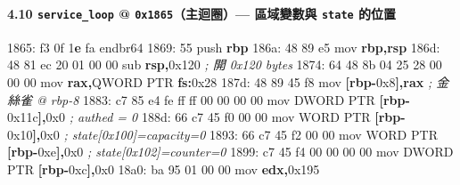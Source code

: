 \documentclass[10pt,a4paper]{article}
\newenvironment{Shaded}{\begin{snugshade}}{\end{snugshade}}
\newcommand{\BaseNTok}[1]{\textcolor[rgb]{0.00,0.00,0.81}{#1}}
\newcommand{\BuiltInTok}[1]{#1}
\newcommand{\CommentTok}[1]{\textcolor[rgb]{0.56,0.35,0.01}{\textit{#1}}}
\newcommand{\DataTypeTok}[1]{\textcolor[rgb]{0.13,0.29,0.53}{#1}}
\newcommand{\DecValTok}[1]{\textcolor[rgb]{0.00,0.00,0.81}{#1}}
\newcommand{\ErrorTok}[1]{\textcolor[rgb]{0.64,0.00,0.00}{\textbf{#1}}}
\newcommand{\FloatTok}[1]{\textcolor[rgb]{0.00,0.00,0.81}{#1}}
\newcommand{\KeywordTok}[1]{\textcolor[rgb]{0.13,0.29,0.53}{\textbf{#1}}}
\newcommand{\NormalTok}[1]{#1}
\newcommand{\OperatorTok}[1]{\textcolor[rgb]{0.81,0.36,0.00}{\textbf{#1}}}
\renewenvironment{Shaded}{%
  \def\FrameCommand{\fboxsep=3.2pt\colorbox{shadecolor}}%
  \MakeFramed{\advance\hsize-\width\FrameRestore\small}%
}{%
  \endMakeFramed
}
\begin{document}
\paragraph{\texorpdfstring{4.10 \texttt{service\_\allowbreak{}loop} @
\texttt{0x1865}（主迴圈）--- 區域變數與 \texttt{state}
的位置}{4.10 service\_loop @ 0x1865（主迴圈）--- 區域變數與 state 的位置}}\label{service_loop-0x1865ux4e3bux8ff4ux5708-ux5340ux57dfux8b8aux6578ux8207-state-ux7684ux4f4dux7f6e}

\begin{Shaded}
\begin{Highlighting}[]
\NormalTok{1865: f3 }\FloatTok{0}\BaseNTok{f} \DecValTok{1}\ErrorTok{e}\NormalTok{ fa            endbr64}
\NormalTok{1869: 55                     }\BuiltInTok{push}   \KeywordTok{rbp}
\NormalTok{186a: 48 89 e5               mov    }\KeywordTok{rbp}\OperatorTok{,}\KeywordTok{rsp}
\NormalTok{186d: 48 81 ec }\DecValTok{20} \DecValTok{01} \DecValTok{00} \DecValTok{00}\NormalTok{   sub    }\KeywordTok{rsp}\OperatorTok{,}\BaseNTok{0x120}                \CommentTok{; 開 0x120 bytes}
\NormalTok{1874: 64 48 8b 04 25 28 00 00 00  }\BuiltInTok{mov} \KeywordTok{rax}\OperatorTok{,}\DataTypeTok{QWORD} \DataTypeTok{PTR} \KeywordTok{fs}\OperatorTok{:}\BaseNTok{0x28}
\NormalTok{187d: 48 89 45 f8            mov    }\OperatorTok{[}\KeywordTok{rbp}\OperatorTok{{-}}\BaseNTok{0x8}\OperatorTok{],}\KeywordTok{rax}            \CommentTok{; 金絲雀 @ rbp{-}8}
\NormalTok{1883: c7 }\DecValTok{85}\NormalTok{ e4 fe ff ff }\DecValTok{00} \DecValTok{00} \DecValTok{00} \DecValTok{00}\NormalTok{  mov }\DataTypeTok{DWORD} \DataTypeTok{PTR} \OperatorTok{[}\KeywordTok{rbp}\OperatorTok{{-}}\BaseNTok{0x11c}\OperatorTok{],}\BaseNTok{0x0}  \CommentTok{; authed = 0}
\NormalTok{188d: 66 c7 }\DecValTok{45}\NormalTok{ f0 }\DecValTok{00} \DecValTok{00}\NormalTok{      mov    }\DataTypeTok{WORD} \DataTypeTok{PTR} \OperatorTok{[}\KeywordTok{rbp}\OperatorTok{{-}}\BaseNTok{0x10}\OperatorTok{],}\BaseNTok{0x0}   \CommentTok{; state[0x100]=capacity=0}
\NormalTok{1893: 66 c7 }\DecValTok{45}\NormalTok{ f2 }\DecValTok{00} \DecValTok{00}\NormalTok{      mov    }\DataTypeTok{WORD} \DataTypeTok{PTR} \OperatorTok{[}\KeywordTok{rbp}\OperatorTok{{-}}\BaseNTok{0xe}\OperatorTok{],}\BaseNTok{0x0}    \CommentTok{; state[0x102]=counter=0}
\NormalTok{1899: c7 }\DecValTok{45}\NormalTok{ f4 }\DecValTok{00} \DecValTok{00} \DecValTok{00} \DecValTok{00}\NormalTok{   mov    }\DataTypeTok{DWORD} \DataTypeTok{PTR} \OperatorTok{[}\KeywordTok{rbp}\OperatorTok{{-}}\BaseNTok{0xc}\OperatorTok{],}\BaseNTok{0x0}
\NormalTok{18a0: ba }\DecValTok{95} \DecValTok{01} \DecValTok{00} \DecValTok{00}\NormalTok{         mov    }\KeywordTok{edx}\OperatorTok{,}\BaseNTok{0x195}

\end{Highlighting}
\end{Shaded}
\end{document}
